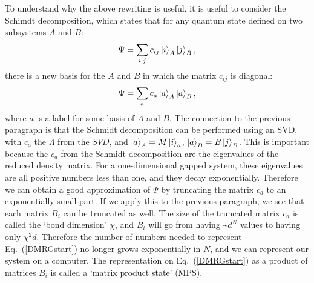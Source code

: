 To understand why the above rewriting is useful, it is useful to consider the Schimdt decomposition, which states that for any quantum state defined on two subsystems $A$ and $B$:
\begin{equation}
\Psi=\sum_{i,j}c_{ij}\ket{i}_A\ket{j}_B,
\end{equation}
there is a new basis for the $A$ and $B$ in which the matrix $c_{ij}$ is diagonal:
\begin{equation}
\Psi=\sum_{a}c_{a}\ket{a}_A\ket{a}_B,
\end{equation}
where $a$ is a label for some basis of $A$ and $B$. The connection to the previous paragraph is that the Schmidt decomposition can be performed using an SVD, with $c_a$ the $\Lambda$ from the $SVD$, and $\ket{a}_A=M\ket{i}_a$, $\ket{a}_B=B\ket{j}_B$. This is important because the $c_a$ from the Schmidt decomposition are the eigenvalues of the reduced density matrix. For a one-dimensional gapped system, these eigenvalues are all positive numbers less than one, and they decay exponentially. Therefore we can obtain a good approximation of $\Psi$ by truncating the matrix $c_a$ to an exponentially small part. If we apply this to the previous paragraph, we see that each matrix $B_i$ can be truncated as well. The size of the truncated matrix $c_a$ is called the `bond dimension' $\chi$, and $B_i$ will go from having \sim$d^N$ values to having only $\chi^2 d$. Therefore the number of numbers needed to represent Eq.~(\ref{DMRGstart}) no longer grows exponentially in $N$, and we can represent our system on a computer. The representation on Eq.~(\ref{DMRGstart}) as a product of matrices $B_i$ is called a `matrix product state' (MPS).

